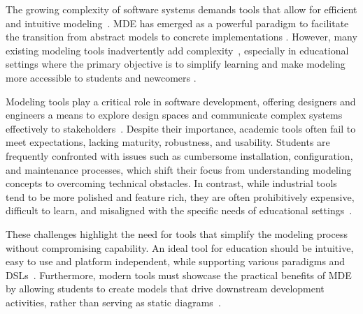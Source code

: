 The growing complexity of software systems demands tools that allow for efficient and intuitive modeling~\cite{abrahao2017user}. MDE has emerged as a powerful paradigm to facilitate the transition from abstract models to concrete implementations \cite{3103551,10350721}. However, many existing modeling tools inadvertently add complexity~\cite{brooks1987essence}, especially in educational settings where the primary objective is to simplify learning and make modeling more accessible to students and newcomers \cite{Liebel2017}.

Modeling tools play a critical role in software development, offering designers and engineers a means to explore design spaces and communicate complex systems effectively to stakeholders~\cite{Kienzle2024}. Despite their importance, academic tools often fail to meet expectations, lacking maturity, robustness, and usability. Students are frequently confronted with issues such as cumbersome installation, configuration, and maintenance processes, which shift their focus from understanding modeling concepts to overcoming technical obstacles. In contrast, while industrial tools tend to be more polished and feature rich, they are often prohibitively expensive, difficult to learn, and misaligned with the specific needs of educational settings~\cite{Kienzle2024}.  

These challenges highlight the need for tools that simplify the modeling process without compromising capability. An ideal tool for education should be intuitive, easy to use and platform independent, while supporting various paradigms and DSLs~\cite{Kienzle2024}. Furthermore, modern tools must showcase the practical benefits of MDE by allowing students to create models that drive downstream development activities, rather than serving as static diagrams~\cite{Stahl2006}. 

